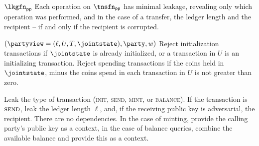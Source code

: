 \begin{leakagefnsketch}{$\lkgfn_{\mathsf{pp}}$}
  Each operation on $\tnsfn_{\mathsf{pp}}$ has minimal leakage, revealing only
  which operation was performed, and in the case of a transfer, the ledger length and
  the recipient -- if and only if the recipient is corrupted.

  \vsep

  \begin{receiveinputsketch*}{$(\partyview = (\ell, U, T, \jointstate), \party, w)$}
    Reject initialization transactions if $\jointstate$ is already initialized, or
    a transaction in $U$ is an initializing transaction. Reject spending
    transactions if the coins held in $\jointstate$, minus the coins spend in each
    transaction in $U$ is not greater than zero.

    Leak the type of transaction (\textsc{init}, \textsc{send}, \textsc{mint},
    or \textsc{balance}). If the transaction is $\textsc{send}$, leak the ledger length
    $\ell$, and, if the receiving public key is adversarial, the recipient. There
    are no dependencies. In the case of minting, provide the calling party's
    public key as a context, in the case of balance queries, combine the
    available balance and provide this as a context.
  \end{receiveinputsketch*}
\end{leakagefnsketch}

